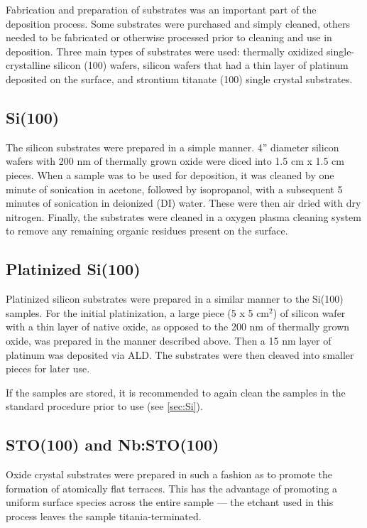 Fabrication and preparation of substrates was an important part of the deposition process. Some substrates were purchased and simply cleaned, others needed to be fabricated or otherwise processed prior to cleaning and use in deposition. Three main types of substrates were used: thermally oxidized single-crystalline silicon (100) wafers, silicon wafers that had a thin layer of platinum deposited on the surface, and strontium titanate (100) single crystal substrates. 

\subsection{Si(100)} \label{sec:Si}

The silicon substrates were prepared in a simple manner. 4'' diameter silicon wafers with 200 nm of thermally grown oxide were diced into 1.5 cm x 1.5 cm pieces. When a sample was to be used for deposition, it was cleaned by one minute of sonication in acetone, followed by isopropanol, with a subsequent 5 minutes of sonication in deionized (DI) water. These were then air dried with dry nitrogen. Finally, the substrates were cleaned in a oxygen plasma cleaning system to remove any remaining organic residues present on the surface. 



\subsection{Platinized Si(100)}

Platinized silicon substrates were prepared in a similar manner to the Si(100) samples. For the initial platinization, a large piece (5 x 5 cm$^{2}$) of silicon wafer with a thin layer of native oxide, as opposed to the 200 nm of thermally grown oxide, was prepared in the manner described above. Then a 15 nm layer of platinum was deposited via ALD. The substrates were then cleaved into smaller pieces for later use. 

If the samples are stored, it is recommended to again clean the samples in the standard procedure prior to use (see \vref{sec:Si}).


\subsection{STO(100) and Nb:STO(100)}

Oxide crystal substrates were prepared in such a fashion as to promote the formation of atomically flat terraces. This has the advantage of promoting a uniform surface species across the entire sample --- the etchant used in this process leaves the sample titania-terminated.\cite{koster_quasi-ideal_1998}

